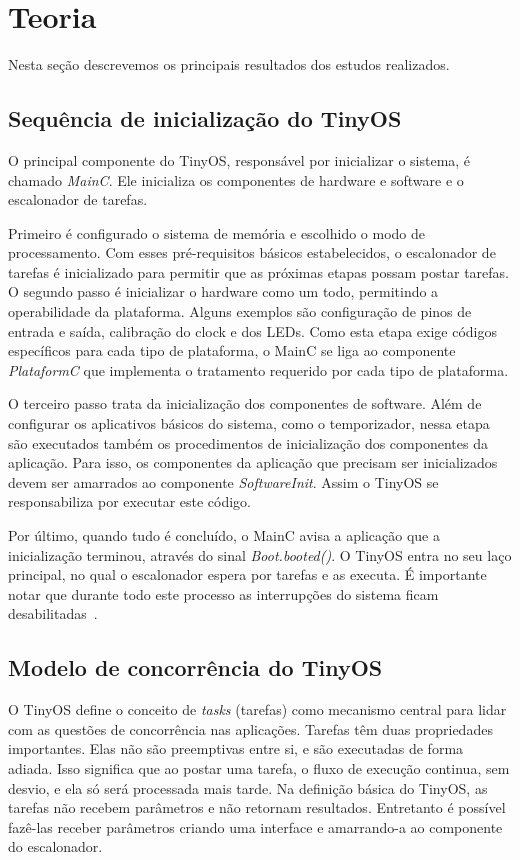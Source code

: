 \documentclass[a4paper,onecolumn, 10pt]{article}
\begin{document}
\section{Teoria}\label{teoria}
Nesta seção descrevemos os principais resultados dos estudos realizados.

\subsection {Sequência de inicialização do TinyOS}
O principal componente do TinyOS, responsável por inicializar o sistema, é chamado \textit{MainC}. 
Ele inicializa os componentes de hardware e software e o escalonador de tarefas. 

Primeiro é configurado o sistema de memória e escolhido o modo de processamento. 
Com esses pré-requisitos básicos estabelecidos,  o escalonador de tarefas é inicializado 
para permitir que as próximas etapas possam postar tarefas.
O segundo passo é inicializar o hardware como um todo, permitindo a operabilidade da plataforma.
Alguns exemplos são configuração de pinos de entrada e saída, calibração do clock e dos LEDs.
Como esta etapa exige códigos específicos para cada tipo de plataforma, o MainC se liga ao componente
\textit{PlataformC} que implementa o tratamento requerido por cada tipo de plataforma.

O terceiro passo trata da inicialização dos componentes de software. 
Além de configurar os aplicativos básicos do sistema, como
o temporizador, nessa etapa são executados também os procedimentos de inicialização dos componentes 
da aplicação. Para isso, os componentes da aplicação que precisam ser inicializados devem ser amarrados ao componente 
{\em SoftwareInit}. Assim o TinyOS se responsabiliza por executar este código.

Por último, quando tudo é concluído, o MainC avisa a aplicação que a inicialização terminou, através do
sinal \textit{Boot.booted()}. O TinyOS entra no
seu laço principal, no qual o escalonador espera por tarefas e as executa. É importante notar que
durante todo este processo as interrupções do sistema ficam desabilitadas~\cite{TEP107}.


\subsection{Modelo de concorrência do TinyOS}
O TinyOS define o conceito de {\em tasks} (tarefas) como mecanismo central para
lidar com as questões de concorrência nas aplicações. 
Tarefas têm duas propriedades importantes. Elas não são preemptivas entre si, e são
executadas de forma adiada. Isso significa que ao postar uma tarefa, o fluxo de execução continua,
sem desvio, e ela só será processada mais tarde. 
Na definição básica do TinyOS, as tarefas não recebem parâmetros e não retornam resultados. 
Entretanto é possível fazê-las receber parâmetros criando uma interface e amarrando-a ao componente do escalonador.
\end{document}
